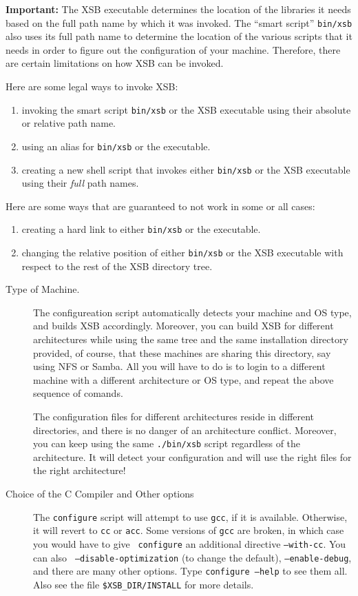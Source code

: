 {\bf Important:} The XSB executable determines the location of the
libraries it needs based on the full path name by which it was invoked.
The ``smart script'' \verb|bin/xsb| also uses its full path name to
determine the location of the various scripts that it needs in order to
figure out the configuration of your machine.  Therefore, there are certain
limitations on how XSB can be invoked.

Here are some legal ways to invoke XSB:
\begin{enumerate}
\item  invoking the smart script \verb|bin/xsb| or the XSB executable using
  their absolute or relative path name.
\item using an alias for \verb|bin/xsb| or the executable.
\item creating a new shell script that invokes either \verb|bin/xsb| or the
  XSB executable using their {\em full\/} path names. 
\end{enumerate}

Here are some ways that are guaranteed to not work in some or all cases:
\begin{enumerate}
\item  creating a hard link to either \verb|bin/xsb| or the executable.
\item changing the relative position of either \verb|bin/xsb| or the
  XSB executable with respect to the rest of the XSB directory tree.
\end{enumerate}

\begin{description}
\item[Type of Machine.]  The configureation script automatically detects
  your machine and OS type, and builds XSB accordingly. Moreover, you can
  build XSB for different architectures while using the same tree and the
  same installation directory provided, of course, that these machines are
  sharing this directory, say using NFS or Samba. All you will have to do
  is to login to a different machine with a different architecture or OS
  type, and repeat the above sequence of comands.
  
  The configuration files for different architectures reside in different
  directories, and there is no danger of an architecture conflict.
  Moreover, you can keep using the same {\tt ./bin/xsb} script regardless
  of the architecture. It will detect your configuration and will use the
  right files for the right architecture! 
  
\item[Choice of the C Compiler and Other options] \label{cc}
  The {\tt configure} script will attempt to use {\tt gcc}, if it is available.
  Otherwise, it will revert to {\tt cc} or {\tt acc}.  Some versions of
  {\tt gcc} are broken, in which case you would have to give {\tt
    configure} an additional directive {\tt --with-cc}.  You can also {\tt
    --disable-optimization} (to change the default), {\tt --enable-debug},
  and there are many other options.  Type {\tt configure --help} to see
  them all. Also see the file \verb'$XSB_DIR/INSTALL' for more details.
\end{description}


